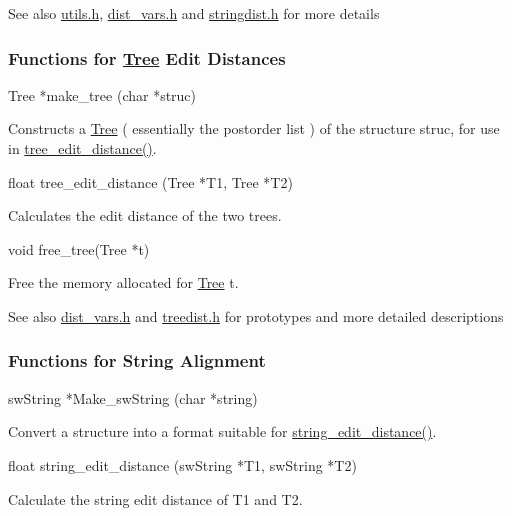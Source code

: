 \begin{DoxySeeAlso}{See also}
\mbox{\hyperlink{utils_8h}{utils.\+h}}, \mbox{\hyperlink{dist__vars_8h}{dist\+\_\+vars.\+h}} and \mbox{\hyperlink{stringdist_8h}{stringdist.\+h}} for more details
\end{DoxySeeAlso}
\subsubsection*{Functions for \mbox{\hyperlink{structTree}{Tree}} Edit Distances}

\begin{DoxyVerb}Tree   *make_tree (char *struc)
\end{DoxyVerb}
 Constructs a \mbox{\hyperlink{structTree}{Tree}} ( essentially the postorder list ) of the structure \textquotesingle{}struc\textquotesingle{}, for use in \mbox{\hyperlink{treedist_8h_a3b21f1925f7071f46d93431a835217bb}{tree\+\_\+edit\+\_\+distance()}}.

\begin{DoxyVerb}float   tree_edit_distance (Tree *T1,
                            Tree *T2) 
\end{DoxyVerb}
 Calculates the edit distance of the two trees.

\begin{DoxyVerb}void    free_tree(Tree *t)
\end{DoxyVerb}
 Free the memory allocated for \mbox{\hyperlink{structTree}{Tree}} t.

\begin{DoxySeeAlso}{See also}
\mbox{\hyperlink{dist__vars_8h}{dist\+\_\+vars.\+h}} and \mbox{\hyperlink{treedist_8h}{treedist.\+h}} for prototypes and more detailed descriptions
\end{DoxySeeAlso}
\subsubsection*{Functions for String Alignment}

\begin{DoxyVerb}swString *Make_swString (char *string)
\end{DoxyVerb}
 Convert a structure into a format suitable for \mbox{\hyperlink{stringdist_8h_a89e3c335ef17780576d7c0e713830db9}{string\+\_\+edit\+\_\+distance()}}.

\begin{DoxyVerb}float     string_edit_distance (swString *T1,
                                swString *T2)
\end{DoxyVerb}
 Calculate the string edit distance of T1 and T2.

